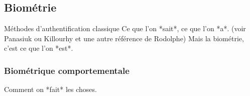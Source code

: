 \subsection{Biométrie}

Méthodes d'authentification classique Ce que l'on *sait*, ce que l'on *a*. (voir Panasiuk ou Killourhy et une autre référence de Rodolphe)
Mais la biométrie, c'est ce que l'on *est*.

\subsubsection{Biométrique comportementale}
Comment on *fait* les choses.
